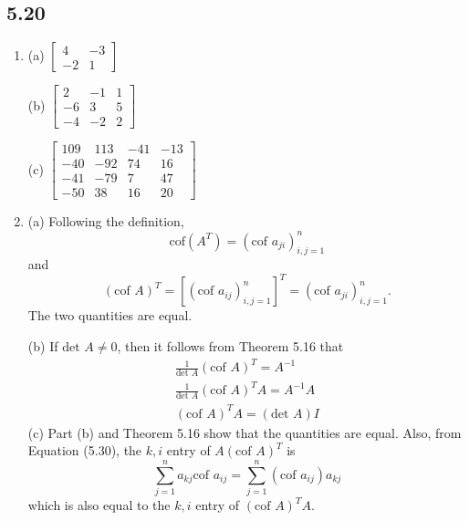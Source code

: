 \documentclass[a4paper, 12pt]{article}
\begin{document}
	\subsection*{5.20}
	\begin{enumerate}
		\item (a) $\left[ \begin{array}{cc}
		4 & -3 \\
		-2 & 1
		\end{array} \right]$ \par
		(b) $\left[ \begin{array}{ccc}
		2 & -1 & 1 \\
		-6 & 3 & 5 \\
		-4 & -2 & 2
		\end{array} \right]$ \par
		(c) $\left[ \begin{array}{cccc}
		109 & 113 & -41 & -13 \\
		-40 & -92 & 74 & 16 \\
		-41 & -79 & 7 & 47 \\
		-50 & 38 & 16 & 20
		\end{array} \right]$
		
		\setcounter{enumi}{3}
		\item (a) Following the definition,
		\[ \mbox{cof}\left( A^T \right) = \left( \mbox{cof }a_{ji} \right)_{i,j = 1}^n \]
		and
		\[ \left( \mbox{cof }A \right)^T = \left[ \left( \mbox{cof }a_{ij} \right)_{i,j = 1}^n \right]^T = \left( \mbox{cof }a_{ji} \right)_{i,j = 1}^n. \]
		The two quantities are equal. \par
		(b) If $\mbox{det }A \neq 0$, then it follows from Theorem 5.16 that
		\begin{gather*}
		\frac{1}{\mbox{det }A}\left( \mbox{cof }A \right)^T = A^{-1} \\
		\frac{1}{\mbox{det }A}\left( \mbox{cof }A \right)^T A = A^{-1}A \\
		\left( \mbox{cof }A \right)^T A = (\mbox{det }A)I
		\end{gather*}
		(c) Part (b) and Theorem 5.16 show that the quantities are equal. Also, from Equation (5.30), the $k, i$ entry of $A(\mbox{cof }A)^T$ is
		\[ \sum_{j = 1}^{n}a_{kj}\mbox{cof }a_{ij} = \sum_{j = 1}^{n}(\mbox{cof }a_{ij})a_{kj} \]
		which is also equal to the $k, i$ entry of $(\mbox{cof }A)^T A$.
	\end{enumerate}
\end{document}
